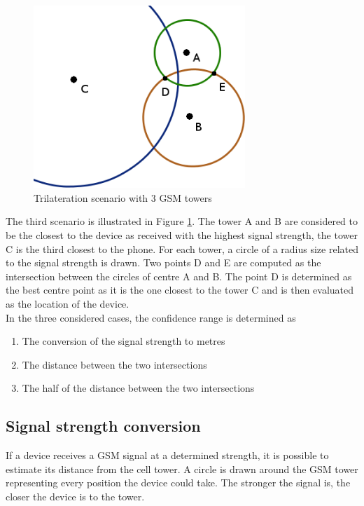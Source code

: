 \begin{figure}[h]
  \centering
  \includegraphics[width=8cm]{images/tower-schema.png}
  \caption{Trilateration scenario with 3 GSM towers}
  \label{fig:triangulation-scenario-3}
\end{figure}
The third scenario is illustrated in Figure \ref{fig:triangulation-scenario-3}.
The tower A and B are considered to be the closest to the device as received with the highest signal strength, the tower C is the third closest to the phone.
For each tower, a circle of a radius size related to the signal strength is drawn.
Two points D and E are computed as the intersection between the circles of centre A and B.
The point D is determined as the best centre point as it is the one closest to the tower C and is then evaluated as the location of the device.\\

In the three considered cases, the confidence range is determined as
\begin{enumerate}
\item The conversion of the signal strength to metres
\item The distance between the two intersections
\item The half of the distance between the two intersections
\end{enumerate}


\subsection{Signal strength conversion}

If a device receives a GSM signal at a determined strength, it is possible to estimate its distance from the cell tower.
A circle is drawn around the GSM tower representing every position the device could take.
The stronger the signal is, the closer the device is to the tower.\\

